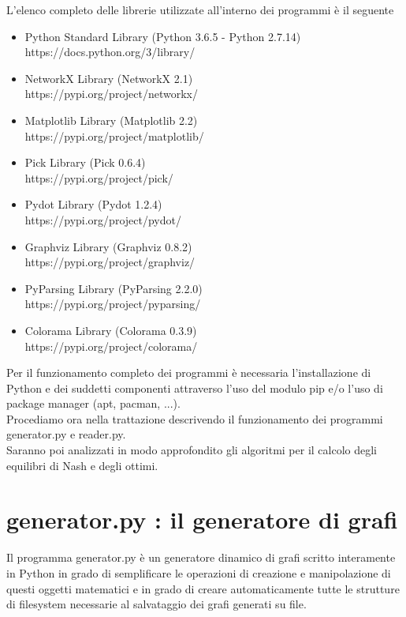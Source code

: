 L'elenco completo delle librerie utilizzate all'interno dei programmi è il seguente 

\begin{itemize}
	\item Python Standard Library (Python 3.6.5 - Python 2.7.14)\\
	https://docs.python.org/3/library/
	\item NetworkX Library (NetworkX 2.1)\\ 	
	https://pypi.org/project/networkx/	
	\item Matplotlib Library (Matplotlib 2.2)\\
	https://pypi.org/project/matplotlib/
	\item Pick Library (Pick 0.6.4)\\
	https://pypi.org/project/pick/
	\item Pydot Library (Pydot 1.2.4)\\
	https://pypi.org/project/pydot/
	\item Graphviz Library (Graphviz 0.8.2)\\
	https://pypi.org/project/graphviz/
	\item PyParsing Library (PyParsing 2.2.0)\\
	https://pypi.org/project/pyparsing/
	\item Colorama Library (Colorama 0.3.9)\\
	https://pypi.org/project/colorama/
\end{itemize}

Per il funzionamento completo dei programmi è necessaria l'installazione di Python e dei suddetti componenti attraverso l'uso del modulo pip e/o l'uso di package manager (apt, pacman, ...).\\

Procediamo ora nella trattazione descrivendo il funzionamento dei programmi generator.py e reader.py.\\
Saranno poi analizzati in modo approfondito gli algoritmi per il calcolo degli equilibri di Nash e degli ottimi.\\

\section{generator.py : il generatore di grafi}
\justify
Il programma generator.py è un generatore dinamico di grafi scritto interamente in Python in grado di semplificare le operazioni di creazione e manipolazione di questi oggetti matematici e in grado di creare automaticamente tutte le strutture di filesystem necessarie al salvataggio dei grafi generati su file.\\

